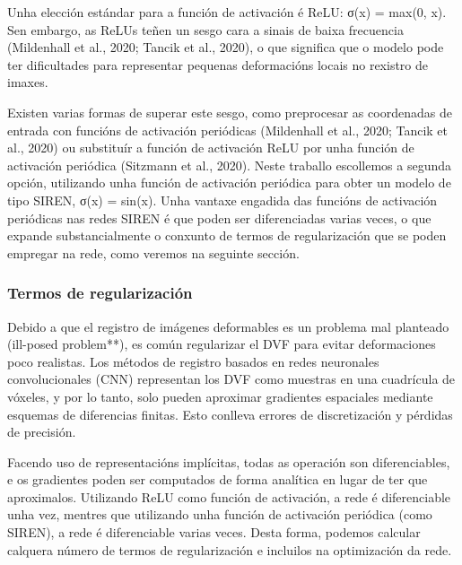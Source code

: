 Unha elección estándar para a función de activación é ReLU: σ(x) = max(0, x).
Sen embargo, as ReLUs teñen un sesgo cara a sinais de baixa frecuencia (Mildenhall et al., 2020; Tancik et al., 2020), 
 o que significa que o modelo pode ter dificultades para representar pequenas deformacións locais no rexistro de imaxes.
 
Existen varias formas de superar este sesgo, como preprocesar as coordenadas de entrada con funcións de activación periódicas (Mildenhall et al., 2020; Tancik et al., 2020) ou substituír a función de activación ReLU por unha función de activación periódica (Sitzmann et al., 2020).
Neste traballo escollemos a segunda opción, utilizando unha función de activación periódica para obter un modelo de tipo SIREN, σ(x) = sin(x).
Unha vantaxe engadida das funcións de activación periódicas nas redes SIREN é que poden ser diferenciadas varias veces, 
o que expande substancialmente o conxunto de termos de regularización que se poden empregar na rede, como veremos na seguinte sección.

\subsubsection{Termos de regularización}
\label{subsubsec:Termos de regularización}

Debido a que el registro de imágenes deformables es un problema mal planteado (ill-posed problem**), 
es común regularizar el DVF para evitar deformaciones poco realistas.
 Los métodos de registro basados en redes neuronales convolucionales (CNN) representan los DVF 
 como muestras en una cuadrícula de vóxeles, y por lo tanto, solo pueden aproximar gradientes espaciales
 mediante esquemas de diferencias finitas. Esto conlleva errores de discretización y pérdidas de precisión.

Facendo uso de representacións implícitas, todas as operación son diferenciables, e os gradientes poden
 ser computados de forma analítica en lugar de ter que aproximalos.
Utilizando ReLU como función de activación, a rede é diferenciable unha vez, mentres que utilizando
 unha función de activación periódica (como SIREN), a rede é diferenciable varias veces.
Desta forma, podemos calcular calquera número de termos de regularización e incluilos na optimización da rede.

